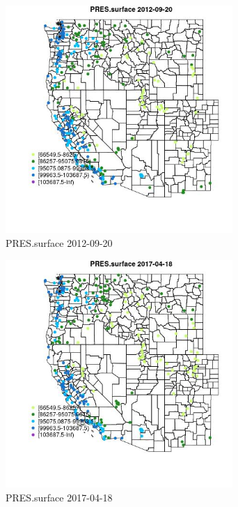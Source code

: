 \begin{figure} 
\centering  
\includegraphics[width=0.77\textwidth]{Code_Outputs/Report_ML_input_PM25_Step4_part_e_de_duplicated_aves_compiled_2019-05-14wNAs_MapObsPRESsurface2012-09-20.jpg} 
\caption{\label{fig:Report_ML_input_PM25_Step4_part_e_de_duplicated_aves_compiled_2019-05-14wNAsMapObsPRESsurface2012-09-20}PRES.surface 2012-09-20} 
\end{figure} 
 

\clearpage 

\begin{figure} 
\centering  
\includegraphics[width=0.77\textwidth]{Code_Outputs/Report_ML_input_PM25_Step4_part_e_de_duplicated_aves_compiled_2019-05-14wNAs_MapObsPRESsurface2017-04-18.jpg} 
\caption{\label{fig:Report_ML_input_PM25_Step4_part_e_de_duplicated_aves_compiled_2019-05-14wNAsMapObsPRESsurface2017-04-18}PRES.surface 2017-04-18} 
\end{figure} 
 

